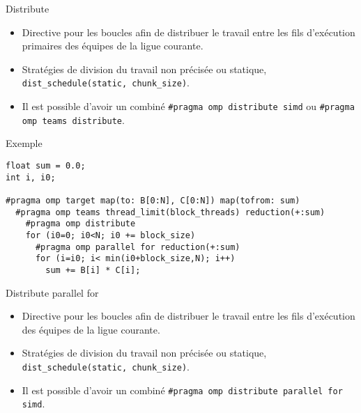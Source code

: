 \documentclass[10pt]{beamer}
\begin{document}
\begin{frame}[fragile]{Distribute}

  \begin{itemize}
    \item Directive pour les boucles afin de distribuer le travail entre les fils d'exécution primaires des équipes de la ligue courante.

    \item Stratégies de division du travail non précisée ou statique, \verb|dist_schedule(static, chunk_size)|.

    \item Il est possible d'avoir un combiné \verb|#pragma omp distribute simd| ou \verb|#pragma omp teams distribute|.

  \end{itemize}
\end{frame}

\begin{frame}[fragile]{Exemple}

  \small
  \begin{verbatim}
float sum = 0.0;
int i, i0;

#pragma omp target map(to: B[0:N], C[0:N]) map(tofrom: sum)
  #pragma omp teams thread_limit(block_threads) reduction(+:sum)
    #pragma omp distribute
    for (i0=0; i0<N; i0 += block_size)
      #pragma omp parallel for reduction(+:sum)
      for (i=i0; i< min(i0+block_size,N); i++)
        sum += B[i] * C[i];
  \end{verbatim}
\end{frame}

\begin{frame}[fragile]{Distribute parallel for}

  \begin{itemize}
    \item Directive pour les boucles afin de distribuer le travail entre les fils d'exécution des équipes de la ligue courante.

    \item Stratégies de division du travail non précisée ou statique, \verb|dist_schedule(static, chunk_size)|.

    \item Il est possible d'avoir un combiné \verb|#pragma omp distribute parallel for simd|.

  \end{itemize}
\end{frame}
\end{document}
